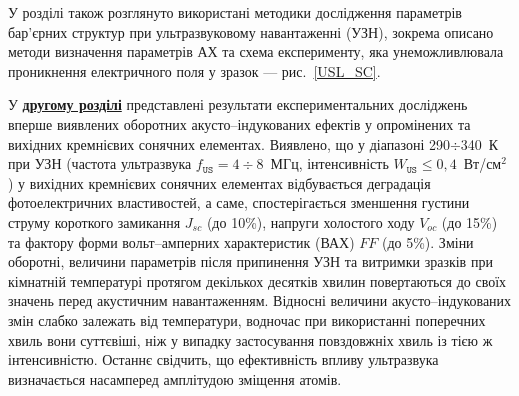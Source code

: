 У розділі також розглянуто використані методики дослідження параметрів бар'єрних структур при ультразвуковому навантаженні (УЗН),
зокрема описано методи визначення параметрів АХ та
схема експерименту, яка унеможливлювала проникнення електричного поля у зразок --- рис.~\ref{USL_SC}.







У  \underline{\textbf{другому розділі}} представлені результати експериментальних досліджень вперше виявлених оборотних акусто--індукованих ефектів у опромінених та вихідних кремнієвих сонячних елементах.
Виявлено, що
   у діапазоні 290$\div$340~К при УЗН (частота ультразвука $f_\mathtt{US}=4\div8$~МГц, інтенсивність $W_\mathtt{US}\leq0,4$~Вт/см$^2$) у вихідних кремнієвих сонячних елементах  відбувається деградація
фотоелектричних властивостей, а саме,
спостерігається зменшення густини струму короткого замикання $J_{sc}$ (до 10\%), напруги холостого ходу $V_{oc}$ (до 15\%) та фактору форми вольт--амперних характеристик (ВАХ) $F\!F$ (до 5\%).
Зміни оборотні, величини параметрів  після припинення УЗН  та витримки зразків при кімнатній температурі протягом декількох десятків хвилин повертаються до своїх значень перед акустичним навантаженням.
Відносні величини акусто--індукованих змін слабко залежать від температури, водночас при використанні поперечних хвиль вони суттєвіші, ніж у випадку застосування повздовжніх хвиль із тією ж інтенсивністю.
Останнє свідчить, що ефективність впливу ультразвука визначається насамперед амплітудою зміщення атомів.


